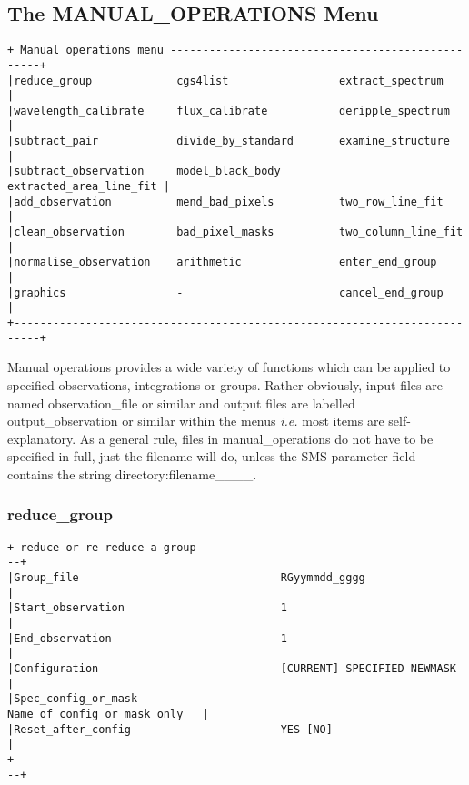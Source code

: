 {\subsection{The MANUAL\_OPERATIONS Menu}
\label{the_manual_operations_menu}
\begin{verbatim}
+ Manual operations menu --------------------------------------------------+
|reduce_group             cgs4list                 extract_spectrum        |
|wavelength_calibrate     flux_calibrate           deripple_spectrum       |
|subtract_pair            divide_by_standard       examine_structure       |
|subtract_observation     model_black_body         extracted_area_line_fit |
|add_observation          mend_bad_pixels          two_row_line_fit        |
|clean_observation        bad_pixel_masks          two_column_line_fit     |
|normalise_observation    arithmetic               enter_end_group         |
|graphics                 -                        cancel_end_group        |
+--------------------------------------------------------------------------+
\end{verbatim}

Manual operations provides a wide variety of functions which can be applied
to specified observations, integrations or groups. Rather obviously, input 
files are named {\sf observation\_file} or similar and output files are labelled
{\sf output\_observation} or similar within the menus {\em i.e.} most
items are self-explanatory. As a general rule, files in {\sf manual\_operations}
do not have to be specified in full, just the filename will do, unless
the SMS parameter field contains the string 
{\sf directory:filename\_\_\_\_}.

\subsubsection{reduce\_group}
\label{reduce_group}
\begin{verbatim}
+ reduce or re-reduce a group ------------------------------------------+
|Group_file                               RGyymmdd_gggg                 |
|Start_observation                        1                             |
|End_observation                          1                             |
|Configuration                            [CURRENT] SPECIFIED NEWMASK   |
|Spec_config_or_mask                      Name_of_config_or_mask_only__ |
|Reset_after_config                       YES [NO]                      |
+-----------------------------------------------------------------------+
\end{verbatim}

}
